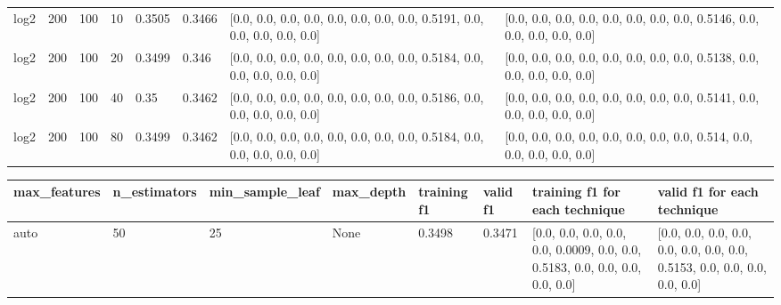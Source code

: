 \documentclass{article}%
\begin{document}
\begin{longtable}{l l l l l l l l}
log2&200&100&10&0.3505&0.3466&{[}0.0, 0.0, 0.0, 0.0, 0.0, 0.0, 0.0, 0.0, 0.5191, 0.0, 0.0, 0.0, 0.0, 0.0{]}&{[}0.0, 0.0, 0.0, 0.0, 0.0, 0.0, 0.0, 0.0, 0.5146, 0.0, 0.0, 0.0, 0.0, 0.0{]}\\%
log2&200&100&20&0.3499&0.346&{[}0.0, 0.0, 0.0, 0.0, 0.0, 0.0, 0.0, 0.0, 0.5184, 0.0, 0.0, 0.0, 0.0, 0.0{]}&{[}0.0, 0.0, 0.0, 0.0, 0.0, 0.0, 0.0, 0.0, 0.5138, 0.0, 0.0, 0.0, 0.0, 0.0{]}\\%
log2&200&100&40&0.35&0.3462&{[}0.0, 0.0, 0.0, 0.0, 0.0, 0.0, 0.0, 0.0, 0.5186, 0.0, 0.0, 0.0, 0.0, 0.0{]}&{[}0.0, 0.0, 0.0, 0.0, 0.0, 0.0, 0.0, 0.0, 0.5141, 0.0, 0.0, 0.0, 0.0, 0.0{]}\\%
log2&200&100&80&0.3499&0.3462&{[}0.0, 0.0, 0.0, 0.0, 0.0, 0.0, 0.0, 0.0, 0.5184, 0.0, 0.0, 0.0, 0.0, 0.0{]}&{[}0.0, 0.0, 0.0, 0.0, 0.0, 0.0, 0.0, 0.0, 0.514, 0.0, 0.0, 0.0, 0.0, 0.0{]}\\%
\hline%
\end{longtable}%
\begin{longtable}{l l l l l l l l}%
\hline%
max\_features&n\_estimators&min\_sample\_leaf&max\_depth&training f1&valid f1&training f1 for each technique&valid f1 for each technique\\%
\hline%
\endhead%
\hline%
auto&50&25&None&0.3498&0.3471&{[}0.0, 0.0, 0.0, 0.0, 0.0, 0.0009, 0.0, 0.0, 0.5183, 0.0, 0.0, 0.0, 0.0, 0.0{]}&{[}0.0, 0.0, 0.0, 0.0, 0.0, 0.0, 0.0, 0.0, 0.5153, 0.0, 0.0, 0.0, 0.0, 0.0{]}\\%
\hline%
\end{longtable}%
\end{document}
